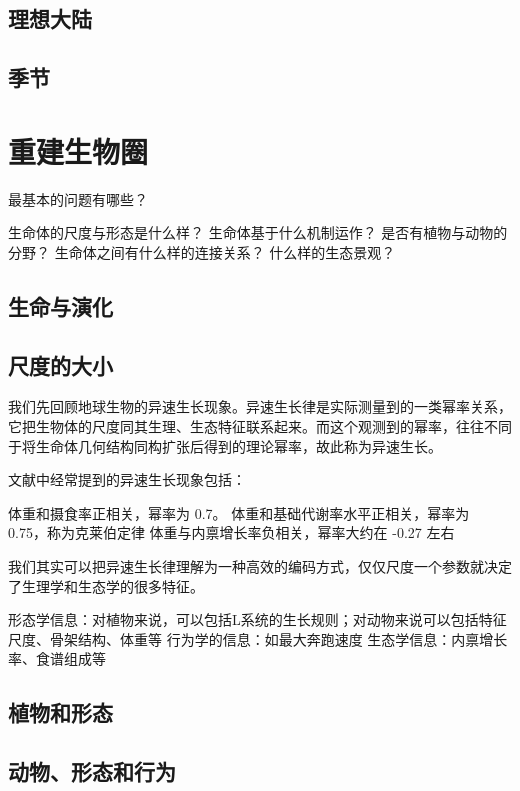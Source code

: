 \documentclass[a4paper,10.5pt]{book}
\begin{document}
\section{理想大陆}

\section{季节}



\chapter{重建生物圈}

最基本的问题有哪些？

生命体的尺度与形态是什么样？
生命体基于什么机制运作？
是否有植物与动物的分野？
生命体之间有什么样的连接关系？
什么样的生态景观？

\section{生命与演化}

\section{尺度的大小}

我们先回顾地球生物的异速生长现象。异速生长律是实际测量到的一类幂率关系，
它把生物体的尺度同其生理、生态特征联系起来。而这个观测到的幂率，往往不同于将生命体几何结构同构扩张后得到的理论幂率，故此称为异速生长。

文献中经常提到的异速生长现象包括：

体重和摄食率正相关，幂率为 0.7。
体重和基础代谢率水平正相关，幂率为 0.75，称为克莱伯定律
体重与内禀增长率负相关，幂率大约在 -0.27 左右

我们其实可以把异速生长律理解为一种高效的编码方式，仅仅尺度一个参数就决定了生理学和生态学的很多特征。

形态学信息：对植物来说，可以包括L系统的生长规则；对动物来说可以包括特征尺度、骨架结构、体重等
行为学的信息：如最大奔跑速度
生态学信息：内禀增长率、食谱组成等

\section{植物和形态}

\section{动物、形态和行为}
\end{document}
